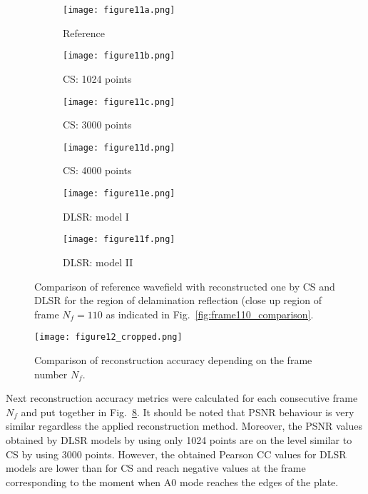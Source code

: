 \begin{figure} [!ht]
	\centering
	\begin{subfigure}[b]{0.32\textwidth}
		\centering
		\texttt{[image: figure11a.png]}
		\caption{Reference}
		\label{fig:frame110delam_ref}
	\end{subfigure}
	\hfill
	\begin{subfigure}[b]{0.32\textwidth}
		\centering
		\texttt{[image: figure11b.png]}
		\caption{CS: 1024 points}
		\label{fig:frame110delam_CS1024}
	\end{subfigure}
	\hfill
	\begin{subfigure}[b]{0.32\textwidth}
		\centering
		\texttt{[image: figure11c.png]}
		\caption{CS: 3000 points}
		\label{fig:frame110delam_CS3000}
	\end{subfigure}	
	\hfill
	\begin{subfigure}[b]{0.32\textwidth}
		\centering
		\texttt{[image: figure11d.png]}
		\caption{CS: 4000 points}
		\label{fig:frame110delam_CS4000}
	\end{subfigure}
	\hfill
	\begin{subfigure}[b]{0.32\textwidth}
		\centering
		\texttt{[image: figure11e.png]}
		\caption{DLSR: model I}
		\label{fig:frame110delam_Abdalraheem}
	\end{subfigure}
	\hfill
	\begin{subfigure}[b]{0.32\textwidth}
		\centering
		\texttt{[image: figure11f.png]}
		\caption{DLSR: model II}
		\label{fig:frame110delam_Saeed}
	\end{subfigure}
	
	\caption{Comparison of reference wavefield with reconstructed one by CS and DLSR for the region of delamination reflection (close up region of frame $N_f = 110$ as indicated in Fig.~\ref{fig:frame110_comparison}.}
	\label{fig:frame110del_comparison}
\end{figure} 
\clearpage
\begin{figure} [!ht]
	\centering
 	\texttt{[image: figure12\_cropped.png]}
	\caption{Comparison of reconstruction accuracy depending on the frame number $N_f$.}
	\label{fig:frame_metrics}
\end{figure}
\clearpage
Next reconstruction accuracy metrics were calculated for each consecutive frame $N_f$ and put together in Fig.~\ref{fig:frame_metrics}.
It should be noted that PSNR behaviour is very similar regardless the applied reconstruction method.
Moreover, the PSNR values obtained by DLSR models by using only 1024 points are on the level similar to CS by using 3000 points.
However, the obtained Pearson CC values for DLSR models are lower than for CS and reach negative values at the frame corresponding to the moment when A0 mode reaches the edges of the plate.

